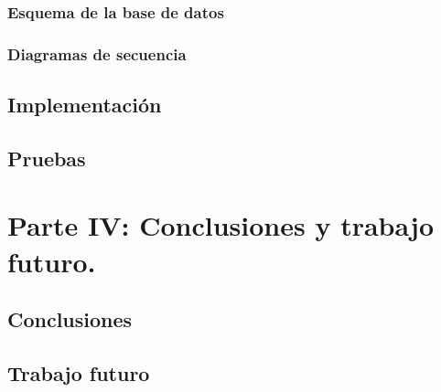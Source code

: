 \documentclass[twoside]{report}
\begin{document}
\subsection{Esquema de la base de datos}
\subsection{Diagramas de secuencia}
\section{Implementación}
\section{Pruebas}

\chapter{Parte IV: Conclusiones y trabajo futuro.}
\section{Conclusiones}
\section{Trabajo futuro}
\end{document}
